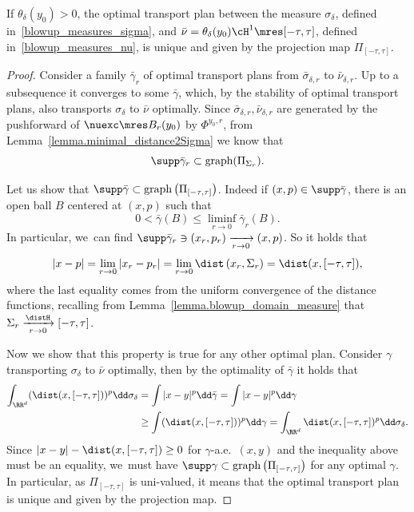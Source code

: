 \begin{lemma}\label{lemma.brenier_map_blowup_family}
If $\theta_\delta(y_0)>0$, the optimal transport plan between the measure $\sigma_{\delta}$, defined in~\eqref{blowup_measures_sigma}, and $\bar \nu = \theta_\delta(y_0)\cH^1\mres [-\tau, \tau]$, defined in~\eqref{blowup_measures_nu}, is unique and given by the projection map $\Pi_{[-\tau, \tau]}$.
\end{lemma}

\begin{proof}
Consider a family $\bar \gamma_r$ of optimal transport plans from $\bar \sigma_{\delta , r}$ to $\bar \nu_{\delta ,r}$. Up to a subsequence it converges to some $\bar \gamma$, which, by the stability of optimal transport plans, also transports $\sigma_{\delta}$ to $\bar \nu$ optimally. Since $\bar \sigma_{\delta , r}, \bar \nu_{\delta ,r}$ are generated by the pushforward of $\nuexc\mres B_r(y_0)$ by $\Phi^{y_0, r}$, from Lemma~\ref{lemma.minimal_distance2Sigma} we know that
\[
\supp \bar \gamma_r \subset \text{graph}(\Pi_{\Sigma_r}).
\]

Let us show that $\supp \bar \gamma \subset \text{graph}\left(\Pi_{[-\tau, \tau]}\right)$. Indeed if $(x,p) \in \supp \bar \gamma$, there is an open ball $B$ centered at $(x,p)$ such that
\[
0 < \bar \gamma(B) \le \liminf_{r \to 0} \bar\gamma_r(B).
\]
In particular, we~can find $\supp \bar \gamma_r \ni (x_r, p_r) \xrightarrow[r \to 0]{} (x,p)$. So it holds that
\[
|x - p|
=
\lim_{r \to 0}
|x_r - p_r|
=
\lim_{r \to 0}
\dist\left(x_r, \Sigma_r\right)
=
\dist(x, [-\tau, \tau]),
\]
where the last equality comes from the uniform convergence of the distance functions, recalling from Lemma~\ref{lemma.blowup_domain_measure} that $\Sigma_r \xrightarrow[r \to 0]{\distH} [-\tau, \tau]$.

Now we show that this property is true for any other optimal plan. Consider $\gamma$ transporting $\sigma_{\delta}$ to $\bar \nu$ optimally, then by the optimality of $\bar \gamma$ it holds that
\begin{align*}
\int_{\RR^d} (\dist(x, [-\tau, \tau]))^p\dd \sigma_{\delta}
&=
\int |x - y|^p\dd \bar\gamma
= \int |x - y|^p\dd \gamma\\
&\ge
\int (\dist(x, [-\tau, \tau]))^p \dd \gamma
=
\int_{\RR^d} \dist(x, [-\tau, \tau])^p\dd \sigma_{\delta}.
\end{align*}
Since $|x - y| - \dist(x,[-\tau, \tau]) \ge 0 $ for $\gamma$-a.e.\ $(x,y)$ and the inequality above must be an equality, we~must have $\supp \gamma \subset \text{graph}\left(\Pi_{[-\tau, \tau]}\right)$ for any optimal $\gamma$. In particular, as $\Pi_{[-\tau, \tau]}$ is uni-valued, it means that the optimal transport plan is unique and given by the projection map.
\end{proof}

